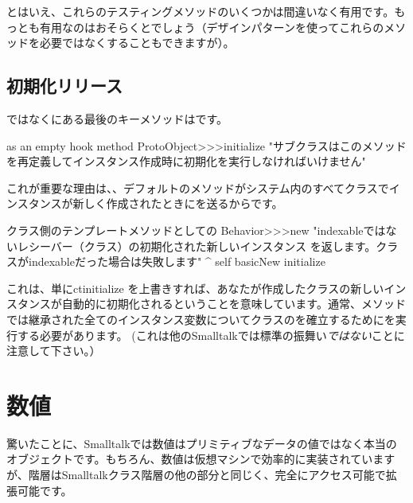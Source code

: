 \documentclass[a4paper,10pt,twoside]{book}
\begin{document}
とはいえ、これらのテスティングメソッドのいくつかは間違いなく有用です。もっとも有用なのはおそらくとでしょう（\cite{Wool98a}デザインパターンを使ってこれらのメソッドを必要ではなくすることもできますが）。


\subsection{初期化リリース}

ではなくにある最後のキーメソッドはです。

\begin{method}{ as an empty hook method}
ProtoObject>>>initialize
   "サブクラスはこのメソッドを再定義してインスタンス作成時に初期化を実行しなければいけません"
\end{method}

これが重要な理由は、、デフォルトのメソッドがシステム内のすべてクラスでインスタンスが新しく作成されたときにを送るからです。

\begin{method}{クラス側のテンプレートメソッドとしての}
Behavior>>>new
    "indexableではないレシーバー（クラス）の初期化された新しいインスタンス
    を返します。クラスがindexableだった場合は失敗します"
    ^ self basicNew initialize
\end{method}

これは、単にct{initialize} を上書きすれば、あなたが作成したクラスの新しいインスタンスが自動的に初期化されるということを意味しています。通常、メソッドでは継承された全てのインスタンス変数についてクラスのを確立するためにを実行する必要があります。
(これは他のSmalltalkでは標準の振舞い\emph{ではない}ことに注意して下さい。）

\section{数値}
驚いたことに、Smalltalkでは数値はプリミティブなデータの値ではなく本当のオブジェクトです。もちろん、数値は仮想マシンで効率的に実装されていますが、階層はSmalltalkクラス階層の他の部分と同じく、完全にアクセス可能で拡張可能です。
\end{document}
